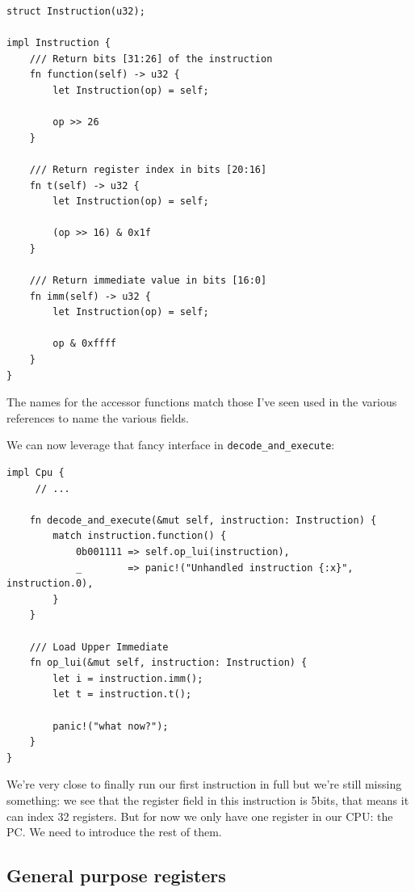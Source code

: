 \documentclass[a4paper]{article}
\newcommand{\code}[1] {\texttt{#1}}
\begin{document}
\begin{lstlisting}
struct Instruction(u32);

impl Instruction {
    /// Return bits [31:26] of the instruction
    fn function(self) -> u32 {
        let Instruction(op) = self;

        op >> 26
    }

    /// Return register index in bits [20:16]
    fn t(self) -> u32 {
        let Instruction(op) = self;

        (op >> 16) & 0x1f
    }

    /// Return immediate value in bits [16:0]
    fn imm(self) -> u32 {
        let Instruction(op) = self;

        op & 0xffff
    }
}
\end{lstlisting}

The names for the accessor functions match those I've seen used in the
various references to name the various fields.

We can now leverage that fancy interface in
\code{decode\_and\_execute}:

\begin{lstlisting}
impl Cpu {
     // ...

    fn decode_and_execute(&mut self, instruction: Instruction) {
        match instruction.function() {
            0b001111 => self.op_lui(instruction),
            _        => panic!("Unhandled instruction {:x}", instruction.0),
        }
    }

    /// Load Upper Immediate
    fn op_lui(&mut self, instruction: Instruction) {
        let i = instruction.imm();
        let t = instruction.t();

        panic!("what now?");
    }
}
\end{lstlisting}

We're very close to finally run our first instruction in full but
we're still missing something: we see that the register field in this
instruction is 5bits, that means it can index 32 registers. But for
now we only have one register in our CPU: the PC. We need to
introduce the rest of them.

\subsection{General purpose registers}
\end{document}
